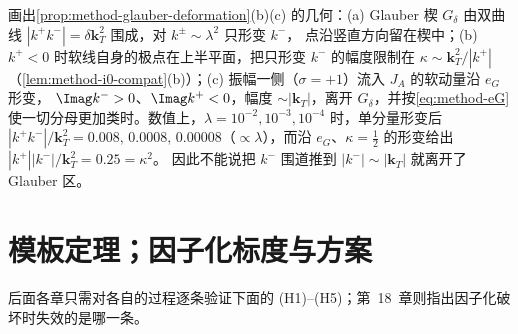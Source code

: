 \begin{remark}[一个分量的形变为何不够]\label{rem:method-two-component}
画出\cref{prop:method-glauber-deformation}(b)(c) 的几何：(a) Glauber 楔 $G_\delta$ 由双曲线 $|k^+k^-|=\delta\mathbf k_T^2$ 围成，对 $k^\pm\sim\lambda^2$ 只形变 $k^-$，
点沿竖直方向留在楔中；(b) $k^+<0$ 时软线自身的极点在上半平面，把只形变 $k^-$ 的幅度限制在 $\kappa\sim\mathbf k_T^2/|k^+|$（\cref{lem:method-i0-compat}(b)）；(c) 振幅一侧（$\sigma=+1$）流入 $J_A$ 的软动量沿 $e_G$ 形变，
$\Imag k^->0$、$\Imag k^+<0$，幅度 $\sim|\mathbf k_T|$，离开 $G_\delta$，并按\cref{eq:method-eG}使一切分母更加类时。数值上，$\lambda=10^{-2},10^{-3},10^{-4}$ 时，单分量形变后
$|k^+k^-|/\mathbf k_T^2=0.008,\,0.0008,\,0.00008$（$\propto\lambda$），而沿 $e_G$、$\kappa=\frac12$ 的形变给出 $|k^+||k^-|/\mathbf k_T^2=0.25=\kappa^2$。%
因此不能说把 $k^-$ 围道推到 $|k^-|\sim|\mathbf k_T|$ 就离开了 Glauber 区。
\end{remark}

\section{模板定理；因子化标度与方案}\label{sec:method-template}

后面各章只需对各自的过程逐条验证下面的 (H1)--(H5)；第~18~章则指出因子化破坏时失效的是哪一条。

